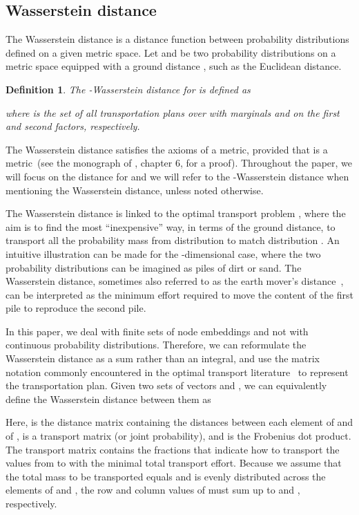 \documentclass{article}
\newtheorem{definition}{Definition}
\begin{document}
\subsection{Wasserstein distance}

The Wasserstein distance is a distance function between probability distributions defined on a given metric space. Let  and  be two probability distributions on a metric space  equipped with a ground distance , such as the Euclidean distance.
\begin{definition}
\label{def:wasserstein}
The -Wasserstein distance for  is defined as

where  is the set of all transportation plans  over  with marginals  and  on the first and second factors, respectively.
\end{definition}
The Wasserstein distance satisfies the axioms of a metric, provided that  is a metric~(see the monograph of \citet{villani2008optimal}, chapter 6, for a proof).
Throughout the paper, we will focus on the distance for  and we will refer to the -Wasserstein distance when mentioning the Wasserstein distance, unless noted otherwise.

The Wasserstein distance is linked to the optimal transport problem \citep{villani2008optimal}, where the aim is to find the most ``inexpensive'' way, in terms of the ground distance, to transport all the probability mass from distribution  to match distribution . 
An intuitive illustration can be made for the -dimensional case, where the two probability distributions can be imagined as piles of dirt or sand. The Wasserstein distance, sometimes also referred to as the earth mover's distance~\citep{rubner2000earth}, can be interpreted as the minimum effort required to move the content of the first pile to reproduce the second pile.

In this paper, we deal with finite sets of node embeddings and not with continuous probability distributions. Therefore, we can reformulate the Wasserstein distance as a sum rather than an integral, and use the matrix notation commonly encountered in the optimal transport literature~\citep{rubner2000earth} to represent the transportation plan.
Given two sets of vectors  and , we can equivalently define the Wasserstein distance between them as

Here,  is the distance matrix containing the distances  between each element  of  and  of ,   is a transport matrix (or joint probability), and  is the Frobenius dot product. The transport matrix  contains the fractions that indicate how to transport the values from  to  with the minimal total transport effort. Because we assume that the total mass to be transported equals  and is evenly distributed across the elements of  and , the row and column values of  must sum up to  and , respectively.
\end{document}
